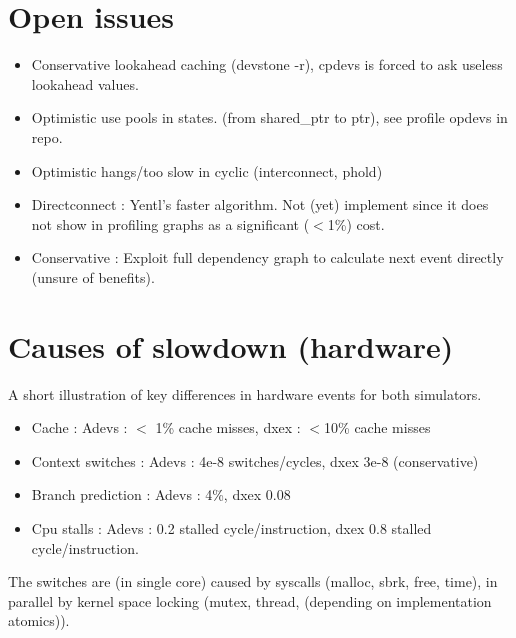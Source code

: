 \documentclass[]{article}
\begin{document}
\section{Open issues}
\begin{itemize}
	\item Conservative lookahead caching (devstone -r), cpdevs is forced to ask useless lookahead values.
	\item Optimistic use pools in states. (from shared\_ptr to ptr), see profile opdevs in repo.
	\item Optimistic hangs/too slow in cyclic (interconnect, phold)
	\item Directconnect : Yentl's faster algorithm. Not (yet) implement since it does not show in profiling graphs as a significant ($<$1\%) cost.
	\item Conservative : Exploit full dependency graph to calculate next event directly (unsure of benefits).
\end{itemize}
\section{Causes of slowdown (hardware)}
A short illustration of key differences in hardware events for both simulators.
\begin{itemize}
	\item Cache : Adevs : $<$ 1\% cache misses, dxex : $<$10\% cache misses
	\item Context switches : Adevs : 4e-8 switches/cycles, dxex 3e-8 (conservative)
	\item Branch prediction : Adevs : 4\%, dxex 0.08%
	\item Cpu stalls : Adevs : 0.2 stalled cycle/instruction, dxex 0.8 stalled cycle/instruction.
\end{itemize}
The switches are (in single core) caused by syscalls (malloc, sbrk, free, time), in parallel by kernel space locking (mutex, thread, (depending on implementation atomics)).
\end{document}
